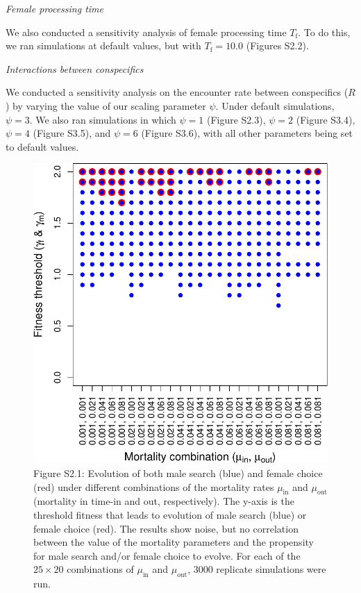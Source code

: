 \documentclass[
]{article}
\begin{document}
\emph{Female processing time}

We also conducted a sensitivity analysis of female processing time
\(T_{\mathrm{f}}\). To do this, we ran simulations at default values,
but with \(T_{\mathrm{f}} = 10.0\) (Figures S2.2).

\emph{Interactions between conspecifics}

We conducted a sensitivity analysis on the encounter rate between
conspecifics (\(R\)) by varying the value of our scaling parameter
\(\psi\). Under default simulations, \(\psi = 3\). We also ran
simulations in which \(\psi = 1\) (Figure S2.3), \(\psi = 2\) (Figure
S3.4), \(\psi = 4\) (Figure S3.5), and \(\psi = 6\) (Figure S3.6), with
all other parameters being set to default values.

\clearpage

\captionsetup{labelformat=empty}

\begin{figure}
\centering
\includegraphics{index_files/figure-latex/unnamed-chunk-5-1.pdf}
\caption{Figure S2.1: Evolution of both male search (blue) and female
choice (red) under different combinations of the mortality rates
\(\mu_{\mathrm{in}}\) and \(\mu_{\mathrm{out}}\) (mortality in time-in
and out, respectively). The y-axis is the threshold fitness that leads
to evolution of male search (blue) or female choice (red). The results
show noise, but no correlation between the value of the mortality
parameters and the propensity for male search and/or female choice to
evolve. For each of the \(25 \times 20\) combinations of
\(\mu_{\mathrm{in}}\) and \(\mu_{\mathrm{out}}\), 3000 replicate
simulations were run.}
\end{figure}
\end{document}
